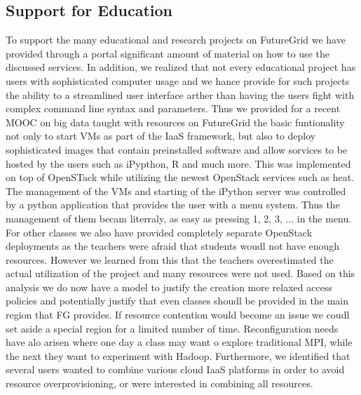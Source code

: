 

\subsection{Support for Education}

To support the many educational and research projects on FutureGrid we have provided through a portal significant amount of material on how to use the discussed services. In addition, we realized that not every educational project has users with sophisticated computer usage and we hance provide for such projects the ability to a streamlined user interface arther than having the users fight with complex command line syntax and parameters. Thus we provided for a recent MOOC on big data taught with resources on FutureGrid the basic funtionality not only to start VMs as part of the IaaS framework, but also to deploy sophisticated images that contain preinstalled software and allow sorvices to be hosted by the users such as iPypthon, R and much more. This was implemented on top of OpenSTack while utilizing the newest OpenStack services such as heat. The management of the VMs and starting of the iPython server was controlled by a python application that provides the user with a menu system. Thus the management of them becam literraly, as easy as pressing 1, 2, 3, ... in the menu.
For other classes we also have provided completely separate OpenStack deployments as the teachers were afraid that students woudl not have enough resources. However we learned from this that the teachers overestimated the actual utilization of the project and many resources were not used. Based on this analysis we do now have a model to justify the creation more relaxed access policies and potentially justify that even classes shoudl be provided in the main region that FG provides. If resource contention would become an issue we coudl set aside a special region for a limited number of time.
Reconfiguration needs have alo arisen where one day a class may want o explore traditional MPI, while the next they want to experiment with Hadoop.
Furthermore, we identified that several users wanted to combine various cloud IaaS platforms in order to avoid resource overprovisioning, or were interested in combining all resources. 
